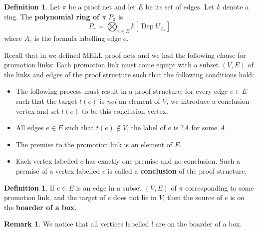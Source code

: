 \documentclass[12pt]{article}
\theoremstyle{plain}
\theoremstyle{definition}
\newtheorem{defn}[thm]{Definition} %
\newtheorem{remark}[thm]{Remark}
\begin{document}
\begin{defn}
Let $\pi$ be a proof net and let $E$ be its set of edges. Let $k$ denote a ring. The \textbf{polynomial ring of $\pi$} $P_{\pi}$ is
\begin{equation}
P_{\pi} = \bigotimes_{e \in E}k[\operatorname{Dep}U_{A_e}]
\end{equation}
where $A_e$ is the formula labelling edge $e$.
\end{defn}

Recall that in \cite{AlgPntExponentials} we defined MELL proof nets and we had the following clause for promotion links: Each promotion link must come equipt with a subset $(V, E)$ of the links and edges of the proof structure such that the following conditions hold:
	\begin{itemize}
		\item The following process must result in a proof structure: for every edge $e \in E$ such that the target $t(e)$ is \emph{not} an element of $V$, we introduce a conclusion vertex and set $t(e)$ to be this conclusion vertex.
		\item All edges $e \in E$ such that $t(e) \not\in V$, the label of $e$ is $?A$ for some $A$.
		\item The premise to the promotion link is an element of $E$.
			\item Each vertex labelled $c$ has exactly one premise and no conclusion. Such a premise of a vertex labelled $c$ is called a \textbf{conclusion} of the proof structure.
	\end{itemize}


\begin{defn}
If $e \in E$ is an edge in a subset $(V,E)$ of $\pi$ corresponding to some promotion link, and the target of $e$ does not lie in $V$, then the source of $e$ is on the \textbf{boarder of a box}.
\end{defn}

\begin{remark}
We notice that all vertices labelled $!$ are on the boarder of a box.
\end{remark}
\end{document}
